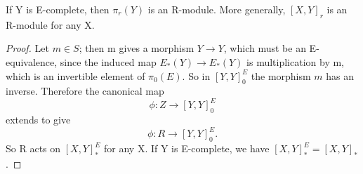 \documentclass[../main]{subfiles}
\begin{document}
\begin{proposition} \label{prop:p3ch14.17}
If Y is E-complete, then $\pi_{r}(Y)$ is an R-module. More generally, $\left[X,Y\right]_{r}$ is an R-module for any X.

\begin{proof} 
    Let $m \in  S$; then m gives a morphism $Y \to Y$, which must be an E-equivalence, since the induced map $E_{\ast}(Y) \to E_{\ast}(Y)$ is multiplication by m, which is an invertible element of $\pi_{0}(E)$. So in $\left[Y,Y\right]^E_{0}$ the morphism $m$ has an inverse. Therefore the canonical map
     $$
      \phi\colon  Z \to  \left[Y,Y\right]^E_{0} 
    $$ 
    extends to give 
    $$
      \phi\colon  R \to  \left[Y,Y\right]^E_{0} .
    $$ 
So R acts on $\left[X,Y\right]^E_{\ast}$ for any X. If Y is E-complete, we have $\left[X,Y\right]^E_{\ast}=\left[X,Y\right]_{\ast}$.
\end{proof}
\end{proposition}
\end{document}
